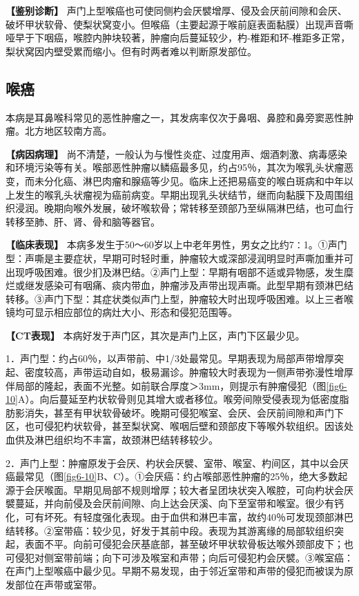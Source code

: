 \textbf{【鉴别诊断】}
声门上型喉癌也可使同侧杓会厌襞增厚、侵及会厌前间隙和会厌、破坏甲状软骨、使梨状窝变小。但喉癌（主要起源于喉前庭表面黏膜）出现声音嘶哑早于下咽癌，喉腔内肿块较著，肿瘤向后蔓延较少，杓-椎距和环-椎距多正常，梨状窝因内壁受累而缩小。但有时两者难以判断原发部位。

\subsection{喉癌}

本病是耳鼻喉科常见的恶性肿瘤之一，其发病率仅次于鼻咽、鼻腔和鼻旁窦恶性肿瘤。北方地区较南方高。

\textbf{【病因病理】}
尚不清楚，一般认为与慢性炎症、过度用声、烟酒刺激、病毒感染和环境污染等有关。喉部恶性肿瘤以鳞癌最多见，约占95％，其次为喉乳头状瘤恶变，而未分化癌、淋巴肉瘤和腺癌等少见。临床上还把易癌变的喉白斑病和中年以上发生的喉乳头状瘤视为癌前病变。早期出现乳头状结节，继而向黏膜下及周围组织浸润。晚期向喉外发展，破坏喉软骨；常转移至颈部乃至纵隔淋巴结，也可血行转移至肺、肝、肾、骨和脑等器官。

\textbf{【临床表现】}
本病多发生于50～60岁以上中老年男性，男女之比约7∶1。①声门型：声嘶是主要症状，早期可时轻时重，肿瘤较大或深部浸润明显时声嘶加重并可出现呼吸困难。很少扪及淋巴结。②声门上型：早期有咽部不适或异物感，发生糜烂或继发感染可有咽痛、痰内带血，肿瘤涉及声带出现声嘶。此型早期有颈淋巴结转移。③声门下型：其症状类似声门上型，肿瘤较大时出现呼吸困难。以上三者喉镜均可显示相应部位的病灶大小、形态和侵犯范围等。

\textbf{【CT表现】} 本病好发于声门区，其次是声门上区，声门下区最少见。

1．声门型：约占60％，以声带前、中1/3处最常见。早期表现为局部声带增厚突起、密度较高，声带运动自如，极易漏诊。肿瘤较大时表现为一侧声带弥漫性增厚伴局部的隆起，表面不光整。如前联合厚度＞3mm，则提示有肿瘤侵犯（图\ref{fig6-10}A）。向后蔓延至杓状软骨则见其增大或者移位。喉旁间隙受侵表现为低密度脂肪影消失，甚至有甲状软骨破坏。晚期可侵犯喉室、会厌、会厌前间隙和声门下区，也可侵犯杓状软骨，甚至梨状窝、喉咽后壁和颈部皮下等喉外软组织。因该处血供及淋巴组织均不丰富，故颈淋巴结转移较少。

2．声门上型：肿瘤原发于会厌、杓状会厌襞、室带、喉室、杓间区，其中以会厌癌最常见（图\ref{fig6-10}B、C）。①会厌癌：约占喉部恶性肿瘤的25％，绝大多数起源于会厌喉面。早期见局部不规则增厚；较大者呈团块状突入喉腔，可向杓状会厌襞蔓延，并向前侵及会厌前间隙、向上达会厌溪、向下至室带和喉室。很少有钙化，可有坏死。有轻度强化表现。由于血供和淋巴丰富，故约40％可发现颈部淋巴结转移。②室带癌：较少见，好发于其前中段。表现为其游离缘的局部软组织突起，表面不平。向前可侵犯会厌基底部，甚至破坏甲状软骨板达喉外颈部皮下；也可侵犯对侧室带前端；向下可涉及喉室和声带；向后可侵犯杓会厌襞。③喉室癌：在声门上型喉癌中最少见。早期不易发现，由于邻近室带和声带的侵犯而被误为原发部位在声带或室带。

